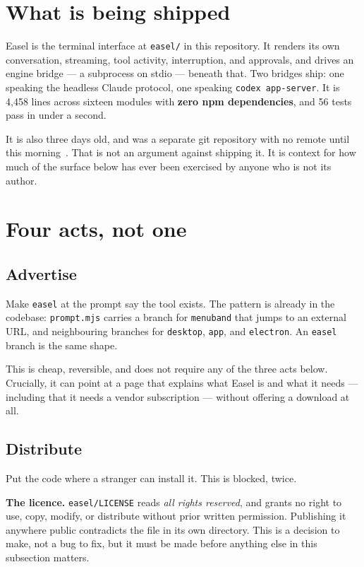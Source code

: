 \documentclass[10pt,letterpaper,twocolumn]{article}
\newcommand{\code}[1]{\texttt{#1}}
\begin{document}
\section{What is being shipped}

Easel is the terminal interface at \code{easel/} in this repository. It renders
its own conversation, streaming, tool activity, interruption, and approvals, and
drives an engine bridge --- a subprocess on stdio --- beneath that. Two bridges
ship: one speaking the headless Claude protocol, one speaking
\code{codex app-server}. It is 4{,}458 lines across sixteen modules with
\textbf{zero npm dependencies}, and 56 tests pass in under a second.

It is also three days old, and was a separate git repository with no remote
until this morning~\citep{scudder2026paying}. That is not an argument against
shipping it. It is context for how much of the surface below has ever been
exercised by anyone who is not its author.

\section{Four acts, not one}

\subsection{Advertise}

Make \code{easel} at the prompt say the tool exists. The pattern is already in
the codebase: \code{prompt.mjs} carries a branch for \code{menuband} that jumps
to an external URL, and neighbouring branches for \code{desktop}, \code{app},
and \code{electron}. An \code{easel} branch is the same shape.

This is cheap, reversible, and does not require any of the three acts below.
Crucially, it can point at a page that explains what Easel is and what it needs
--- including that it needs a vendor subscription --- without offering a
download at all.

\subsection{Distribute}

Put the code where a stranger can install it. This is blocked, twice.

\textbf{The licence.} \code{easel/LICENSE} reads \emph{all rights reserved}, and
grants no right to use, copy, modify, or distribute without prior written
permission. Publishing it anywhere public contradicts the file in its own
directory. This is a decision to make, not a bug to fix, but it must be made
before anything else in this subsection matters.
\end{document}
